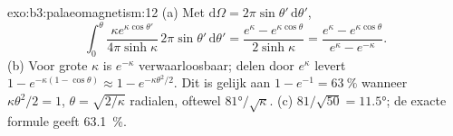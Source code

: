 \begin{solution}{exo:b3:palaeomagnetism:12}
(a) Met $\mathrm d\Omega = 2\pi\sin\theta'\,\mathrm d\theta'$,
\[
  \int_0^\theta\frac{\kappa e^{\kappa\cos\theta'}}{4\pi\sinh\kappa}\,2\pi\sin\theta'\,
  \mathrm d\theta' = \frac{e^\kappa - e^{\kappa\cos\theta}}{2\sinh\kappa}
  = \frac{e^\kappa - e^{\kappa\cos\theta}}{e^\kappa - e^{-\kappa}} .
\]
(b) Voor grote $\kappa$ is $e^{-\kappa}$ verwaarloosbaar; delen door $e^\kappa$
levert $1 - e^{-\kappa(1 - \cos\theta)} \approx 1 - e^{-\kappa\theta^2/2}$. Dit
is gelijk aan $1 - e^{-1} = \qty{63}{\percent}$ wanneer $\kappa\theta^2/2 = 1$, $\theta =
\sqrt{2/\kappa}$ radialen, oftewel $\ang{81}/\sqrt\kappa$. (c) $81/\sqrt{50} =
\ang{11.5}$; de exacte formule geeft \qty{63.1}{\percent}.
\end{solution}


